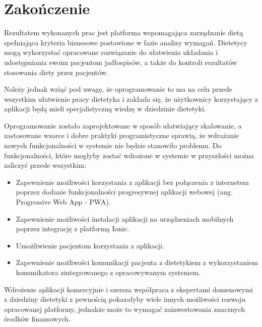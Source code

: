 \chapter*{Zakończenie}\label{ch:ending}
Rezultatem wykonanych prac jest platforma wspomagająca zarządzanie dietą spełniająca kryteria biznesowe postawione w fazie analizy wymagań.
Dietetycy mogą wykorzystać opracowane rozwiązanie do ułatwienia układania i udostępniania swoim pacjentom jadłospisów,
a także do kontroli rezultatów stosowania diety przez pacjentów.

\par
Należy jednak wziąć pod uwagę, że oprogramowanie to ma na celu przede wszystkim ułatwienie pracy dietetyka
i zakłada się, że użytkownicy korzystający z aplikacji będą mieli specjalistyczną wiedzę w dziedzinie dietetyki.

\par
Oprogramowanie zostało zaprojektowane w sposób ułatwiający skalowanie,
a zastosowane wzorce i dobre praktyki programistyczne sprawią, że wdrażanie nowych funkcjonalności w systemie nie będzie stanowiło problemu.
Do funkcjonalności, które mogłyby zostać wdrożone w systemie w przyszłości można zaliczyć przede wszystkim:
\begin{itemize}
    \item Zapewnienie możliwości korzystania z aplikacji bez połączenia z internetem poprzez dodanie funkcjonalności progresywnej aplikacji webowej (ang. Progressive Web App - PWA)\cite{url:pwa}.
    \item Zapewnienie możliwości instalacji aplikacji na urządzeniach mobilnych poprzez integrację z platformą Ionic\cite{tech:ionic}.
    \item Umożliwienie pacjentom korzystania z aplikacji.
    \item Zapewnienie możliwości komunikacji pacjenta z dietetykiem z wykorzystaniem komunikatora zintegrowanego z opracowywanym systemem.
\end{itemize}

\par
Wdrożenie aplikacji komercyjnie i szersza współpraca z ekspertami domenowymi z dziedziny dietetyki z pewnością pokazałyby wiele innych możliwości rozwoju opracowanej platformy,
jednakże może to wymagać zainwestowania znacznych środków finansowych.
\thispagestyle{normal}
